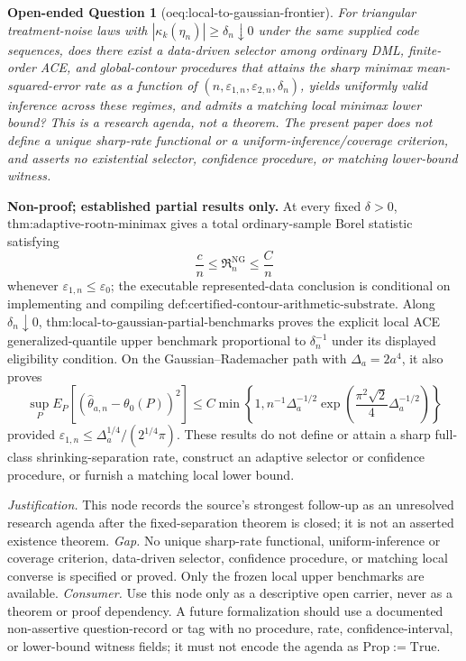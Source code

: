\documentclass{article}
\newtheorem{openendedquestion}{Open-ended Question}
\begin{document}
\begin{openendedquestion}[oeq:local-to-gaussian-frontier]\label{oeq:local-to-gaussian-frontier}
For triangular treatment-noise laws with \(|\kappa_k(\eta_n)|\ge\delta_n\downarrow0\) under the same supplied code sequences, does there exist a data-driven selector among ordinary DML, finite-order ACE, and global-contour procedures that attains the sharp minimax mean-squared-error rate as a function of \((n,\varepsilon_{1,n},\varepsilon_{2,n},\delta_n)\), yields uniformly valid inference across these regimes, and admits a matching local minimax lower bound? This is a research agenda, not a theorem. The present paper does not define a unique sharp-rate functional or a uniform-inference/coverage criterion, and asserts no existential selector, confidence procedure, or matching lower-bound witness.
\end{openendedquestion}
\textbf{Non-proof; established partial results only.} At every fixed \(\delta>0\), \(\text{thm:adaptive-rootn-minimax}\) gives a total ordinary-sample Borel statistic satisfying
\[
 \frac{c}{n}\le \mathfrak R_n^{\mathrm{NG}}\le \frac{C}{n}
\]
whenever \(\varepsilon_{1,n}\le\varepsilon_0\); the executable represented-data conclusion is conditional on implementing and compiling \(\text{def:certified-contour-arithmetic-substrate}\). Along \(\delta_n\downarrow0\), \(\text{thm:local-to-gaussian-partial-benchmarks}\) proves the explicit local ACE generalized-quantile upper benchmark proportional to \(\delta_n^{-1}\) under its displayed eligibility condition. On the Gaussian--Rademacher path with \(\Delta_a=2a^4\), it also proves
\[
 \sup_P E_P\!\left[(\widehat\theta_{a,n}-\theta_0(P))^2\right]
 \le C\min\!\left\{1,
 n^{-1}\Delta_a^{-1/2}
 \exp\!\left(\frac{\pi^2\sqrt2}{4}\Delta_a^{-1/2}\right)
 \right\}
\]
provided \(\varepsilon_{1,n}\le\Delta_a^{1/4}/(2^{1/4}\pi)\). These results do not define or attain a sharp full-class shrinking-separation rate, construct an adaptive selector or confidence procedure, or furnish a matching local lower bound.
\par\smallskip\noindent \textit{Justification.} This node records the source's strongest follow-up as an unresolved research agenda after the fixed-separation theorem is closed; it is not an asserted existence theorem. \textit{Gap.} No unique sharp-rate functional, uniform-inference or coverage criterion, data-driven selector, confidence procedure, or matching local converse is specified or proved. Only the frozen local upper benchmarks are available. \textit{Consumer.} Use this node only as a descriptive open carrier, never as a theorem or proof dependency. A future formalization should use a documented non-assertive question-record or tag with no procedure, rate, confidence-interval, or lower-bound witness fields; it must not encode the agenda as \(\mathrm{Prop}:=\mathrm{True}\).
\end{document}
